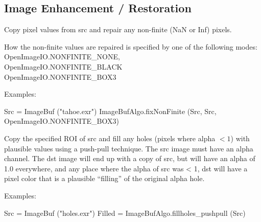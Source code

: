 \subsection{Image Enhancement / Restoration}
\label{sec:iba:py:enhance}

 

Copy pixel values from {\cf src} and repair any non-finite ({\cf NaN} or {\cf
Inf}) pixels.

How the non-finite values are repaired is specified by one of the
following modes: \\
{\cf OpenImageIO.NONFINITE_NONE}, \\
{\cf OpenImageIO.NONFINITE_BLACK} \\ 
{\cf OpenImageIO.NONFINITE_BOX3}

\smallskip
\noindent Examples:
\begin{code}
    Src = ImageBuf ("tahoe.exr")
    ImageBufAlgo.fixNonFinite (Src, Src, OpenImageIO.NONFINITE_BOX3)
\end{code}
\apiend


 

Copy the specified ROI of {\cf src} and fill any 
holes (pixels where alpha $< 1$) with plausible values using a push-pull
technique.  The {\cf src} image must have
an alpha channel.  The {\cf dst} image will end up with a copy of src, but
will have an alpha of 1.0 everywhere, and any place where the alpha
of src was < 1, dst will have a pixel color that is a plausible
``filling'' of the original alpha hole.

\smallskip
\noindent Examples:
\begin{code}
    Src = ImageBuf ("holes.exr")
    Filled = ImageBufAlgo.fillholes_pushpull (Src)
\end{code}
\apiend


 


